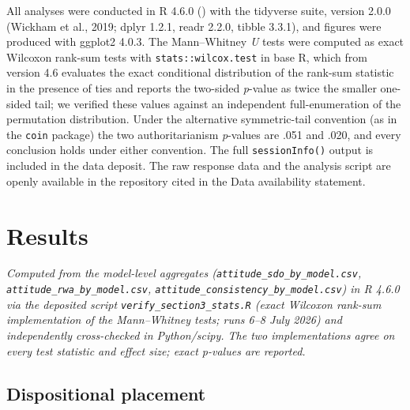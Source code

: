 \documentclass[
]{article}
\begin{document}
All analyses were conducted in R 4.6.0 () with the tidyverse suite, version 2.0.0 (Wickham et
al., 2019; dplyr 1.2.1, readr 2.2.0, tibble 3.3.1), and figures were
produced with ggplot2 4.0.3. The Mann--Whitney \emph{U} tests were
computed as exact Wilcoxon rank-sum tests with
\texttt{stats::wilcox.test} in base R, which from version 4.6 evaluates
the exact conditional distribution of the rank-sum statistic in the
presence of ties and reports the two-sided \emph{p}-value as twice the
smaller one-sided tail; we verified these values against an independent
full-enumeration of the permutation distribution. Under the alternative
symmetric-tail convention (as in the \texttt{coin} package) the two
authoritarianism \emph{p}-values are .051 and .020, and every conclusion
holds under either convention. The full \texttt{sessionInfo()} output is
included in the data deposit. The raw response data and the analysis
script are openly available in the repository cited in the Data
availability statement.

\section{Results}\label{results}

\emph{Computed from the model-level aggregates
(\texttt{attitude\_sdo\_by\_model.csv},
\texttt{attitude\_rwa\_by\_model.csv},
\texttt{attitude\_consistency\_by\_model.csv}) in R 4.6.0 via the
deposited script \texttt{verify\_section3\_stats.R} (exact Wilcoxon
rank-sum implementation of the Mann--Whitney tests; runs 6--8 July 2026)
and independently cross-checked in Python/scipy. The two implementations
agree on every test statistic and effect size; exact p-values are
reported.}

\subsection{Dispositional placement}\label{dispositional-placement}
\end{document}
